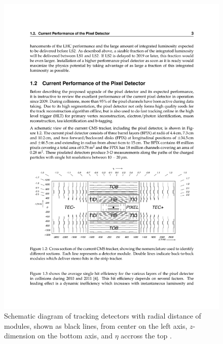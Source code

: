 \begin{figure}[tbh]
\centering
\includegraphics[width=6.5in]{figures/tracker.pdf}
\caption{Schematic diagram of tracking detectors with radial distance of modules, shown as black lines, from center on the left axis, $z$-dimension on the bottom axis, and $\eta$ accross the top \cite{1748-0221-3-08-S08004}.}
\label{fig:tracker}
\end{figure}

